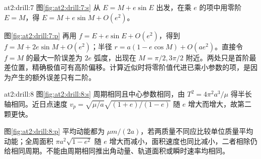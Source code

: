\begin{drillsolution}{at2:drill:7}
  图\ref{fig:at2:drill:7:s} 从 $E=M+e\sin E$ 出发，在乘 $e$ 的项中用零阶 $E=M$，得 $E=M+e\sin M+O(e^2)$。

  图\ref{fig:at2:drill:7:p} 再用 $f=E+e\sin E+O(e^2)$，得到 $f=M+2e\sin M+O(e^2)$；半径 $r=a(1-e\cos M)+O(ae^2)$。直接令 $f=M$ 的最大一阶误差为 $2e$ 弧度，出现在 $M=\pi/2,3\pi/2$ 附近。两处只是首阶最差位置，精确极值可有高阶偏移。计算近似时将零阶值代进已乘小参数的项，是因为产生的额外误差只有二阶。\end{drillsolution}
\begin{drillsolution}{at2:drill:8}
  图\ref{fig:at2:drill:8:s} 周期相同且中心参数相同，由 $T^2=4\pi^2a^3/\mu$ 得半长轴相同。近日点速度 $v_p=\sqrt{\mu/a}\sqrt{(1+e)/(1-e)}$ 随 $e$ 增大而增大，故第二颗更快。

  图\ref{fig:at2:drill:8:p} 平均动能都为 $\mu m/(2a)$，若两质量不同应比较单位质量平均动能；全周面积 $\pi a^2\sqrt{1-e^2}$ 随 $e$ 增大而减小，面积速度也同比减小，二者相除仍给相同周期。不能由周期相同推出角动量、轨道面积或瞬时速率均相同。\end{drillsolution}
